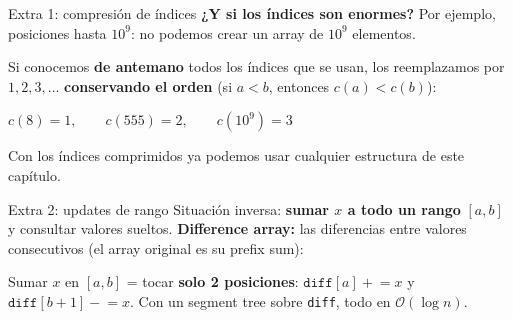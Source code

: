 \documentclass{beamer}
\begin{document}
\begin{frame}{Extra 1: compresión de índices}
    \textbf{¿Y si los índices son enormes?} Por ejemplo, posiciones hasta
    $10^9$: no podemos crear un array de $10^9$ elementos.

    \vspace{0.2cm}
    Si conocemos \textbf{de antemano} todos los índices que se usan, los
    reemplazamos por $1, 2, 3, \ldots$ \textbf{conservando el orden}
    (si $a < b$, entonces $c(a) < c(b)$):
    \begin{center}
        $c(8) = 1, \qquad c(555) = 2, \qquad c(10^9) = 3$
    \end{center}

    \vspace{0.2cm}
    Con los índices comprimidos ya podemos usar cualquier estructura de este
    capítulo.
\end{frame}


\begin{frame}{Extra 2: updates de rango}
    Situación inversa: \textbf{sumar $x$ a todo un rango} $[a,b]$ y consultar
    valores sueltos. \textbf{Difference array:} las diferencias entre valores
    consecutivos (el array original es su prefix sum):
    \begin{center}
    \end{center}

    Sumar $x$ en $[a,b]$ = tocar \textbf{solo 2 posiciones}:
    $\texttt{diff}[a] \mathrel{+}= x$ y $\texttt{diff}[b+1] \mathrel{-}= x$.
    Con un segment tree sobre \texttt{diff}, todo en $\mathcal{O}(\log n)$.
\end{frame}
\end{document}
